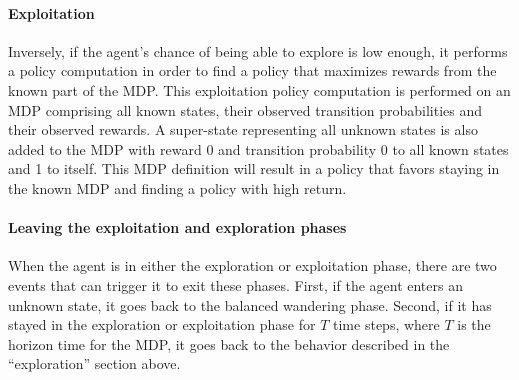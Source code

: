 \paragraph{Exploitation}
Inversely, if the agent's chance of being able to explore is low enough, it performs a policy computation in order to find a policy that maximizes rewards from the known part of the MDP. This exploitation policy computation is performed on an MDP comprising all known states, their observed transition probabilities and their observed rewards. A super-state representing all unknown states is also added to the MDP with reward 0 and transition probability 0 to all known states and 1 to itself. This MDP definition will result in a policy that favors staying in the known MDP and finding a policy with high return.

\paragraph{Leaving the exploitation and exploration phases}
When the agent is in either the exploration or exploitation phase, there are two events that can trigger it to exit these phases. First, if the agent enters an unknown state, it goes back to the balanced wandering phase. Second, if it has stayed in the exploration or exploitation phase for $T$ time steps, where $T$ is the horizon time for the MDP, it goes back to the behavior described in the ``exploration'' section above.

